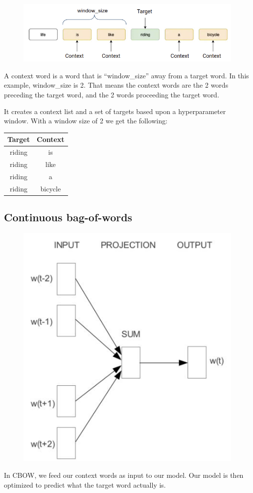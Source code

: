 \documentclass[11pt]{article}
\begin{document}
\begin{figure}[H]
    \centering
    \includegraphics[width=.6\linewidth]{figures/window.png}
\end{figure}

A context word is a word that is ``window\_size'' away from a target word. In this example, window\_size is 2. That means the context words are the 2 words preceding the target word, and the 2 words proceeding the target word.

It creates a context list and a set of targets based upon a hyperparameter window. With a window size of 2 we get the following:

\begin{table}[h]
    \centering
    \begin{tabular}{|c|c|}
        \hline
        \textbf{Target} & \textbf{Context} \\
        \hline
        riding & is \\ 
        riding & like \\
        riding & a \\ 
        riding & bicycle \\ 
        \hline
    \end{tabular}
\end{table}

\subsection{Continuous bag-of-words}

\begin{figure}[H]
    \centering
    \includegraphics[width=.3\linewidth]{figures/CBOW.png}
\end{figure}

In CBOW, we feed our context words as input to our model. Our model is then optimized to predict what the target word actually is.
\end{document}

